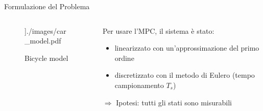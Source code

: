 \documentclass{beamer}
\begin{document}
\begin{frame}{Formulazione del Problema}
\begin{columns}[onlytextwidth,T]
\begin{column}[c]{0.35\textwidth}
\begin{figure}
					\textwidth]{./images/car_model.pdf}
					\caption{Bicycle model}
					\label{fig:car_model}
				\end{figure}
			\end{column}			
			\begin{column}[c]{0.6\textwidth} 
				Per usare l'MPC, il sistema è stato:
				\begin{itemize}
					\item linearizzato con un'approssimazione del primo ordine
					\item discretizzato con il metodo di Eulero (tempo campionamento $T_s$)
				\end{itemize}
				$\Rightarrow$ Ipotesi: tutti gli stati sono misurabili
			\end{column}
		\end{columns}
	\end{frame}
	
\end{document}
